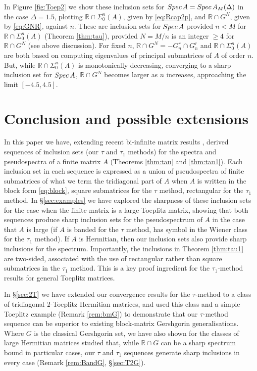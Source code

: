 \documentclass[preprint,1p,11pt]{elsarticle}
\newcommand\R{{\mathbb R}}
\newcommand\eps{{\varepsilon}}
\newcommand\Spec{{\rm Spec}\,}  %
\newcommand\Speps{{\rm Spec}_\eps}
\numberwithin{equation}{section}   %
\numberwithin{figure}{section}  %
\begin{document}
In Figure \ref{fig:Toep2} we show these inclusion sets for $\Spec A=\Spec A_M(\Delta)$ in the case $\Delta=1.5$, plotting $\R\cap \Sigma_0^n(A)$, given by \eqref{eq:Rcap2p}, and $\R\cap G^{N}$, given by \eqref{eq:GNR}, against $n$. These are inclusion sets for $\Spec A$ provided $n<M$ for $\R\cap \Sigma_0^n(A)$ (Theorem \ref{thm:tau}), provided $N=M/n$ is an integer $\geq 4$ for $\R\cap G^{N}$ (see above discussion). For fixed $n$,  $\R\cap G^{N}=-G_n^r\cap G_n^r$ and $\R\cap\Sigma_0^n(A)$ are both based on computing eigenvalues of principal submatrices of $A$ of order $n$. But, while  $\R\cap\Sigma_0^n(A)$ is monotonically decreasing, converging to a sharp inclusion set for $\Spec A$, $\R\cap G^{N}$ becomes larger as $n$ increases, approaching the limit $[-4.5,4.5]$.




\section{Conclusion and possible extensions} \label{sec:concl}

In this paper we have, extending recent bi-infinite matrix results \cite{CW.Heng.ML:SpecIncl1}, derived sequences of inclusion sets (our $\tau$ and $\tau_1$ methods) for the spectra and pseudospectra of a finite matrix $A$ (Theorems \ref{thm:tau} and \ref{thm:tau1}). Each inclusion set in each sequence is expressed as a union of pseudospectra of finite submatrices of what we term the tridiagonal part of $A$ when $A$ is written in the block form \eqref{eq:block},  square submatrices for the $\tau$ method, rectangular for the $\tau_1$ method. In \S\ref{sec:examples} we have explored the sharpness of these inclusion sets for the case when the finite matrix is a large Toeplitz matrix, showing that both sequences produce sharp inclusion sets for the pseudospectrum of $A$ 
  in the case that $A$ is large (if $A$ is banded for the $\tau$ method, has symbol in the Wiener class for the $\tau_1$ method). If $A$ is Hermitian, then our inclusion sets also provide sharp inclusions for the spectrum. Importantly, the inclusions in Theorem \ref{thm:tau1} are two-sided, associated with the use of rectangular rather than square submatrices in the $\tau_1$ method. This is a key proof ingredient for the $\tau_1$-method results for general Toeplitz matrices. 
  
In \S\ref{sec:2T} we have extended our convergence results for the $\tau$-method to a class of tridiagonal 2-Toeplitz Hermitian matrices, and used this class and a simple Toeplitz example (Remark \ref{rem:bmG}) to demonstrate that our $\tau$-method sequence can be superior to existing block-matrix Gershgorin generalisations. Where $G$ is the classical Gershgorin set, we have also shown for the classes of large Hermitian matrices studied that, while $\R\cap G$ can be a sharp spectrum bound in particular cases, our $\tau$ and $\tau_1$ sequences generate sharp inclusions  in every case (Remark \ref{rem:BandG}, \S\ref{sec:T2G}).
\end{document}
